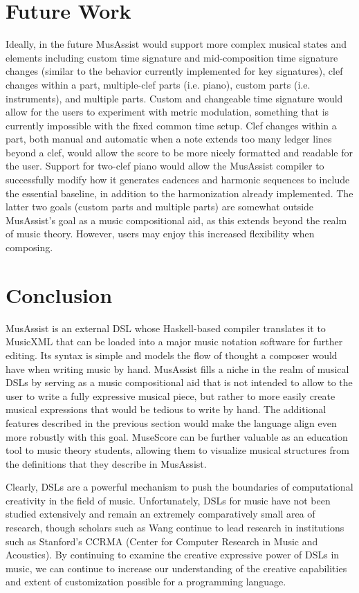 \documentclass{report}
\begin{document}
\section{Future Work}
Ideally, in the future MusAssist would support more complex musical states and elements including custom time signature and mid-composition time signature changes (similar to the behavior currently implemented for key signatures), clef changes within a part, multiple-clef parts (i.e. piano), custom parts (i.e. instruments), and multiple parts. Custom and changeable time signature would allow for the users to experiment with metric modulation, something that is currently impossible with the fixed common time setup. Clef changes within a part, both manual and automatic when a note extends too many ledger lines beyond a clef, would allow the score to be more nicely formatted and readable for the user. Support for two-clef piano would allow the MusAssist compiler to successfully modify how it generates cadences and harmonic sequences to include the essential baseline, in addition to the harmonization already implemented. The latter two goals (custom parts and multiple parts) are somewhat outside MusAssist's goal as a music compositional aid, as this extends beyond the realm of music theory. However, users may enjoy this increased flexibility when composing.

\section{Conclusion}
MusAssist is an external DSL whose Haskell-based compiler translates it to MusicXML that can be loaded into a major music notation software for further editing. Its syntax is simple and models the flow of thought a composer would have when writing music by hand. MusAssist fills a niche in the realm of musical DSLs by serving as a music compositional aid that is not intended to allow to the user to write a fully expressive musical piece, but rather to more easily create musical expressions that would be tedious to write by hand. The additional features described in the previous section would make the language align even more robustly with this goal. MuseScore can be further valuable as an education tool to music theory students, allowing them to visualize musical structures from the definitions that they describe in MusAssist.

Clearly, DSLs are a powerful mechanism to push the boundaries of  computational creativity in the field of music. Unfortunately, DSLs for music have not been studied extensively  and  remain an extremely comparatively small area of research, though scholars such as  Wang continue to lead  research in institutions such as Stanford's CCRMA (Center for Computer Research in Music and Acoustics). By continuing to examine the creative expressive power of DSLs  in  music, we can continue to increase our understanding of the creative capabilities and extent of customization possible for  a programming language.



\end{document}
